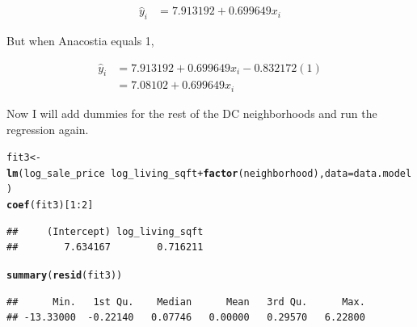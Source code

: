 \documentclass[10pt]{article}\usepackage[]{graphicx}\usepackage[]{color}
\makeatletter
\newcommand{\hlnum}[1]{\textcolor[rgb]{0.686,0.059,0.569}{#1}}%
\newcommand{\hlopt}[1]{\textcolor[rgb]{0,0,0}{#1}}%
\newcommand{\hlstd}[1]{\textcolor[rgb]{0.345,0.345,0.345}{#1}}%
\newcommand{\hlkwb}[1]{\textcolor[rgb]{0.69,0.353,0.396}{#1}}%
\newcommand{\hlkwc}[1]{\textcolor[rgb]{0.333,0.667,0.333}{#1}}%
\newcommand{\hlkwd}[1]{\textcolor[rgb]{0.737,0.353,0.396}{\textbf{#1}}}%
\newenvironment{kframe}{%
 \def\at@end@of@kframe{}%
 \ifinner\ifhmode%
  \def\at@end@of@kframe{\end{minipage}}%
  \begin{minipage}{\columnwidth}%
 \fi\fi%
 \def\FrameCommand##1{\hskip\@totalleftmargin \hskip-\fboxsep
 \colorbox{shadecolor}{##1}\hskip-\fboxsep
     \hskip-\linewidth \hskip-\@totalleftmargin \hskip\columnwidth}%
 \MakeFramed {\advance\hsize-\width
   \@totalleftmargin\z@ \linewidth\hsize
   \@setminipage}}%
 {\par\unskip\endMakeFramed%
 \at@end@of@kframe}
\newenvironment{knitrout}{}{} %
\makeatother
\begin{document}
\begin{align*}
 \hat{y}_i &= 7.913192 + 0.699649 x_i
\end{align*}

But when Anacostia equals 1,

\begin{align*}
\hat{y}_i &= 7.913192 + 0.699649 x_i - 0.832172(1) \\
  &= 7.08102 + 0.699649 x_i
\end{align*}

Now I will add dummies for the rest of the DC neighborhoods and run the regression again.

\begin{knitrout}\small
{}\color{fgcolor}\begin{kframe}
\begin{alltt}
\hlstd{fit3}\hlkwb{<-}\hlkwd{lm}\hlstd{(log_sale_price} \hlopt{~} \hlstd{log_living_sqft} \hlopt{+} \hlkwd{factor}\hlstd{(neighborhood),}\hlkwc{data}\hlstd{=data.model)}
\hlkwd{coef}\hlstd{(fit3)[}\hlnum{1}\hlopt{:}\hlnum{2}\hlstd{]}
\end{alltt}
\begin{verbatim}
##     (Intercept) log_living_sqft 
##        7.634167        0.716211
\end{verbatim}
\begin{alltt}
\hlkwd{summary}\hlstd{(}\hlkwd{resid}\hlstd{(fit3))}
\end{alltt}
\begin{verbatim}
##      Min.   1st Qu.    Median      Mean   3rd Qu.      Max. 
## -13.33000  -0.22140   0.07746   0.00000   0.29570   6.22800
\end{verbatim}
\end{kframe}
\end{knitrout}


\newpage



\end{document}
